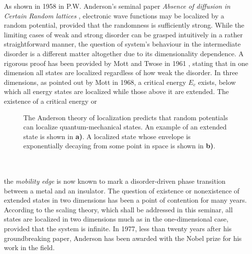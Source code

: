 \documentclass[10pt,a4paper]{article}
\begin{document}
\begin{minipage}[t]{0.45\textwidth}
\noindent As shown in 1958 in P.W. Anderson's seminal paper \emph{Absence of diffusion in Certain Random lattices} \cite{Anderson}, electronic wave functions may be localized by a random potential, provided that the randomness is sufficiently strong.  While the limiting cases of weak and strong disorder can be grasped intuitively in a rather straightforward manner, the question of system's behaviour in the intermediate disorder is a different matter altogether due to its dimensionality dependence. A rigorous proof has been provided by Mott and Twose in 1961 \cite{Mott_Twose}, stating that in one dimension all states are localized regardless of how weak the disorder. In three dimensions, as pointed out by Mott in 1968, a critical energy $E_c$ exists, below which all energy states are localized while those above it are extended. The existence of a critical energy or
\end{minipage}\hfill
\begin{minipage}[t]{0.5\textwidth}
\begin{figure}[H]
\caption{ The Anderson theory of localization predicts that random potentials can localize quantum-mechanical states. An example of an extended state is shown in \textbf{a)}. A localized state whose envelope is exponentially decaying from some point in space is shown in \textbf{b)}.}
\label{fig:loc_ext_states} 
\end{figure}
\end{minipage}\\\\
\noindent 
   the \emph{mobility edge} is now known to mark a disorder-driven phase transition between a metal and an insulator. The question of existence or nonexistence of extended states in two dimensions has been a point of contention for many years. According to the scaling theory, which shall be addressed in this seminar, all states are localized in two dimensions much as in the one-dimensional case, provided that the system is infinite. In 1977, less than twenty years after his groundbreaking paper, Anderson has been awarded with the Nobel prize for his work in the field.   \\\\
\end{document}
